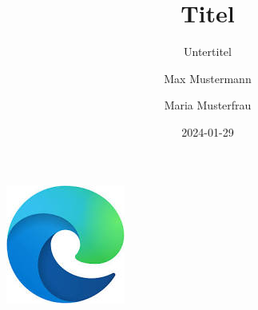 \documentclass[
  11pt,
]{scrbook}
\title{Titel}
\subtitle{Untertitel}
\author{Max Mustermann \and Maria Musterfrau}
\date{2024-01-29}
\begin{document}
  \begin{frontmatter}
  \begin{titlepage}



  	\newcommand{\HRule}{\rule{\linewidth}{0.5mm}} %
  	
  	\center %
  	
  	\includegraphics{logo.jpeg}
  	
  	

\end{titlepage}
\end{frontmatter}
\end{document}
